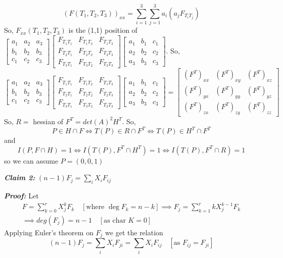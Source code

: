 \documentclass[11pt]{article}
\begin{document}
{$$(F(T_1,T_2,T_3))_{xx}=\sum_{i=1}^3\sum_{j=1}^3a_i(a_j F_{T_iT_j})$$
So, $F_{xx}(T_1,T_2,T_3)$ is the (1,1) position of $\begin{bmatrix}
a_1 & a_2 & a_3\\
b_1 & b_2 & b_3\\
c_1 & c_2 & c_3
\end{bmatrix}\begin{bmatrix}
F_{T_1T_1} & F_{T_1T_2} & F_{T_1T_3}\\
F_{T_2T_1} & F_{T_2T_2} & F_{T_2T_3}\\
F_{T_3T_1} & F_{T_3T_2} & F_{T_3T_3}
\end{bmatrix}\begin{bmatrix}
a_1 & b_1 & c_1\\
a_2 & b_2 & c_2\\
a_3 & b_3 & c_3
\end{bmatrix}$. So, $$\begin{bmatrix}
a_1 & a_2 & a_3\\
b_1 & b_2 & b_3\\
c_1 & c_2 & c_3
\end{bmatrix}\begin{bmatrix}
F_{T_1T_1} & F_{T_1T_2} & F_{T_1T_3}\\
F_{T_2T_1} & F_{T_2T_2} & F_{T_2T_3}\\
F_{T_3T_1} & F_{T_3T_2} & F_{T_3T_3}
\end{bmatrix}\begin{bmatrix}
a_1 & b_1 & c_1\\
a_2 & b_2 & c_2\\
a_3 & b_3 & c_3
\end{bmatrix}=\begin{bmatrix}
(F^T)_{xx} & (F^T)_{xy} & (F^T)_{xz}\\
(F^T)_{yx} & (F^T)_{yy} & (F^T)_{yz}\\
(F^T)_{zx} & (F^T)_{zy} & (F^T)_{zz}
\end{bmatrix}$$
So, $R=$ hessian of $F^{T}=det(A)^2 H^T $. So, $$P\in H\cap F \iff T(P)\in R\cap F^T\iff T(P) \in H^T\cap F^T$$and $$I(P,F\cap H)=1\iff I(T(P),F^T\cap H^T)=1\iff I(T(P),F^T\cap R)=1$$so we can assume $P=(0,0,1)$\Qed

\textbf{\textit{Claim 2: }}$(n-1)F_j=\sum_{i}X_i F_{ij}$

\textbf{\textit{Proof: }}Let \begin{multline*}
	F=\sum_{k=0}^r X_j^k F_k\quad[\text{where }\deg F_k=n-k]\implies F_j=\sum_{k=1}^r kX_j^{k-1}F_k \\
	\implies deg(F_j)=n-1\quad [\text{as char }K=0]
\end{multline*}
Applying Euler's theorem on $F_j$ we get the relation $$(n-1)F_j=\sum_iX_iF_{ji}=\sum_iX_iF_{ij}\quad [\text{as }F_{ij}=F_{ji}]$$\Qed

}
\end{document}
